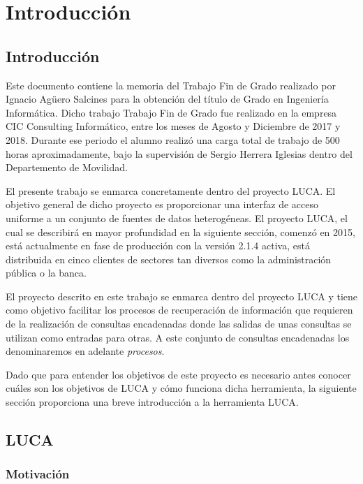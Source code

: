 \chapter{Introducción}

\minitoc
	
\section{Introducción}

Este documento contiene la memoria del Trabajo Fin de Grado realizado por Ignacio Agüero Salcines para la obtención del título de Grado en Ingeniería Informática. Dicho trabajo Trabajo Fin de Grado fue realizado en la empresa CIC Consulting Informático, entre los meses de Agosto y Diciembre de 2017 y 2018. Durante ese periodo el alumno realizó una carga total de trabajo de 500 horas aproximadamente, bajo la supervisión de Sergio Herrera Iglesias dentro del Departemento de Movilidad.

El presente trabajo se enmarca concretamente dentro del proyecto LUCA. El objetivo general de dicho proyecto es proporcionar una interfaz de acceso uniforme a un conjunto de fuentes de datos heterogéneas. El proyecto LUCA, el cual se describirá en mayor profundidad en la siguiente sección, comenzó en 2015, está actualmente en fase de producción con la versión 2.1.4 activa, está distribuida en cinco clientes de sectores tan diversos como la administración pública o la banca.

El proyecto descrito en este trabajo se enmarca dentro del proyecto LUCA y tiene como objetivo facilitar los procesos de recuperación de información que requieren de la realización de consultas encadenadas donde las salidas de unas consultas se utilizan como entradas para otras. A este conjunto de consultas encadenadas los denominaremos en adelante \emph{procesos}. 

Dado que para entender los objetivos de este proyecto es necesario antes conocer cuáles son los objetivos de LUCA y cómo funciona dicha herramienta, la siguiente sección proporciona una breve introducción a la herramienta LUCA.

\section{LUCA}

\subsection{Motivación}

